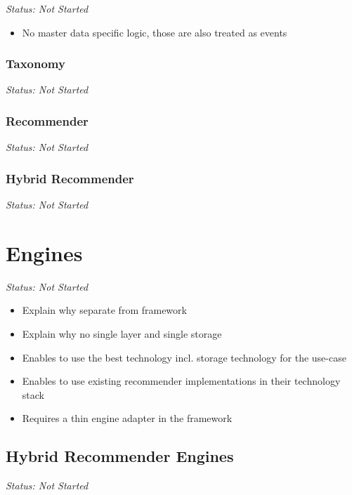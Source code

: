\emph{Status: Not Started}

\begin{itemize}
\item No master data specific logic, those are also treated as events
\end{itemize}

\subsubsection{Taxonomy}

\emph{Status: Not Started}

\subsubsection{Recommender}

\emph{Status: Not Started}

\subsubsection{Hybrid Recommender}

\emph{Status: Not Started}

\section{Engines}

\emph{Status: Not Started}

\begin{itemize}
\item Explain why separate from framework
\item Explain why no single layer and single storage
\item Enables to use the best technology incl. storage technology for the use-case
\item Enables to use existing recommender implementations in their technology stack
\item Requires a thin engine adapter in the framework
\end{itemize}

\subsection{Hybrid Recommender Engines}

\emph{Status: Not Started}
